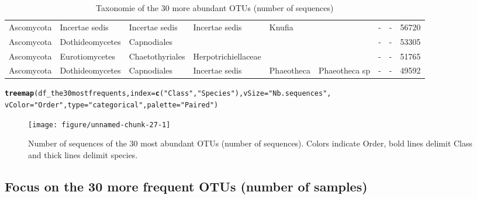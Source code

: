 \documentclass[12pt]{article}\usepackage[]{graphicx}\usepackage[]{color}
\makeatletter
\newcommand{\hlstr}[1]{\textcolor[rgb]{0.192,0.494,0.8}{#1}}%
\newcommand{\hlstd}[1]{\textcolor[rgb]{0.345,0.345,0.345}{#1}}%
\newcommand{\hlkwc}[1]{\textcolor[rgb]{0.333,0.667,0.333}{#1}}%
\newcommand{\hlkwd}[1]{\textcolor[rgb]{0.737,0.353,0.396}{\textbf{#1}}}%
\newenvironment{kframe}{%
 \def\at@end@of@kframe{}%
 \ifinner\ifhmode%
  \def\at@end@of@kframe{\end{minipage}}%
  \begin{minipage}{\columnwidth}%
 \fi\fi%
 \def\FrameCommand##1{\hskip\@totalleftmargin \hskip-\fboxsep
 \colorbox{shadecolor}{##1}\hskip-\fboxsep
     \hskip-\linewidth \hskip-\@totalleftmargin \hskip\columnwidth}%
 \MakeFramed {\advance\hsize-\width
   \@totalleftmargin\z@ \linewidth\hsize
   \@setminipage}}%
 {\par\unskip\endMakeFramed%
 \at@end@of@kframe}
\newenvironment{knitrout}{}{} %
\numberwithin{figure}{section}
\makeatother
\begin{document}
\begin{landscape}
\begin{table}[ht]
\begin{tabular}{llllllllr}
  Ascomycota & Incertae sedis & Incertae sedis & Incertae sedis & Knufia &  & - & - & 56720 \\ 
  Ascomycota & Dothideomycetes & Capnodiales &  &  &  & - & - & 53305 \\ 
  Ascomycota & Eurotiomycetes & Chaetothyriales & Herpotrichiellaceae &  &  & - & - & 51765 \\ 
  Ascomycota & Dothideomycetes & Capnodiales & Incertae sedis & Phaeotheca & Phaeotheca sp & - & - & 49592 \\ 
   \hline
\end{tabular}
\endgroup
\caption{Taxonomie of the 30 more
             abundant OTUs (number of sequences)} 
\end{table}

\end{landscape}

\begin{knitrout}\small
{}\color{fgcolor}\begin{kframe}
\begin{alltt}
\hlkwd{treemap}\hlstd{(df_the30mostfrequents,} \hlkwc{index} \hlstd{=} \hlkwd{c}\hlstd{(}\hlstr{"Class"}\hlstd{,} \hlstr{"Species"}\hlstd{),} \hlkwc{vSize} \hlstd{=} \hlstr{"Nb.sequences"}\hlstd{,}
        \hlkwc{vColor} \hlstd{=} \hlstr{"Order"}\hlstd{,} \hlkwc{type} \hlstd{=} \hlstr{"categorical"}\hlstd{,} \hlkwc{palette} \hlstd{=} \hlstr{"Paired"}\hlstd{)}
\end{alltt}
\end{kframe}\begin{figure}

{\centering \texttt{[image: figure/unnamed-chunk-27-1]} 

}

\caption[Number of sequences of the 30 most abundant OTUs (number of sequences)]{Number of sequences of the 30 most abundant OTUs (number of sequences). Colors indicate Order, bold lines delimit Class and thick lines delimit species.}\label{fig:unnamed-chunk-27}
\end{figure}


\end{knitrout}

  \subsection{Focus on the 30 more frequent OTUs (number of samples)}
\end{document}
